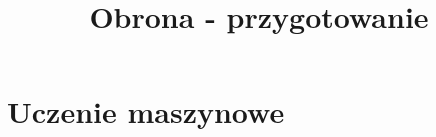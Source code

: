 \documentclass[10pt,a4paper]{article}
\title{\vspace{-2cm}Obrona - przygotowanie}
\begin{document}
  \maketitle

\section{Uczenie maszynowe}
\end{document}
